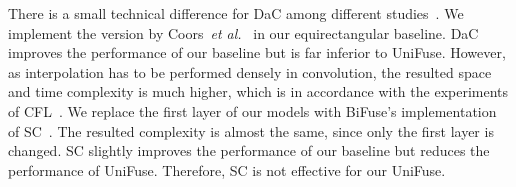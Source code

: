 \documentclass[letterpaper, 10 pt, conference]{ieeeconf}
\def\etal{\emph{et al.}}
\begin{document}
{There is a small technical difference for DaC among different studies~\cite{tateno2018distortion, coors2018spherenet, fernandez2020corners}. We implement the version by Coors~\etal~\cite{coors2018spherenet} in our equirectangular baseline. DaC improves the performance of our baseline but is far inferior to UniFuse. However, as interpolation has to be performed densely in convolution, the resulted space and time complexity is much higher, which is in accordance with the experiments of CFL~\cite{ fernandez2020corners}. We replace the first layer of our models with BiFuse's implementation of SC~\cite{su2017learning}. The resulted complexity is almost the same, since only the first layer is changed. SC slightly improves the performance of our baseline but reduces the performance of UniFuse. Therefore, SC is not effective for our UniFuse. }
\end{document}
